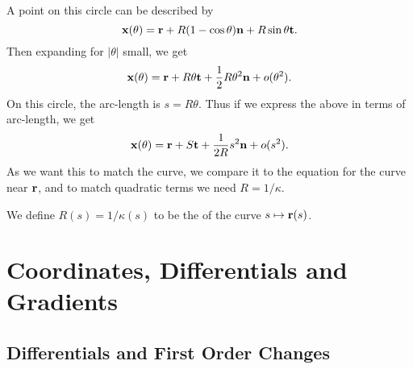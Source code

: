 \documentclass[a4paper]{scrreprt}
\begin{document}
A point on this circle can be described by
$$
\mathbf{x}(\theta) = \mathbf{r} + R(1 - \cos \theta) \mathbf{n} + R \sin \theta \mathbf{t}.
$$
Then expanding for $|\theta|$ small, we get
$$
\mathbf{x} (\theta) = \mathbf{r} + R \theta \mathbf{t} + \frac{1}{2} R \theta^2 \mathbf{n} + o(\theta^2).
$$
On this circle, the arc-length is $s = R \theta$. Thus if we express the above in terms of arc-length, we get
$$
\mathbf{x}(\theta) = \mathbf{r} + S \mathbf{t} + \frac{1}{2R} s^2 \mathbf{n} + o(s^2).
$$
As we want this to match the curve, we compare it to the equation for the curve near $\mathbf{r}$, and to match quadratic terms we need
$R = 1/\kappa$.

\begin{definition}
	We define $R(s)=1/\kappa(s)$ to be the  of the curve $s \mapsto \mathbf{r}(s)$.
\end{definition}

\chapter{Coordinates, Differentials and Gradients}

\section{Differentials and First Order Changes}
\end{document}

